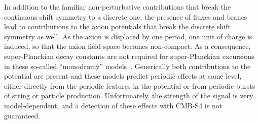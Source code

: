 

In addition to the familiar non-perturbative contributions that break the continuous shift symmetry to a discrete one, the presence of fluxes and branes lead to contributions to the axion potentials that break the discrete shift symmetry as well. As the axion is displaced by one period, one unit of charge is induced, so that the axion field space becomes non-compact. As a consequence, super-Planckian decay constants are not required for super-Planckian excursions in these so-called ``monodromy'' models~\cite{Silverstein:2008sg, McAllister:2008hb, Kaloper:2008fb, Berg:2009tg, Palti:2014kza,McAllister:2014mpa, Marchesano:2014mla, Blumenhagen:2015xpa,Hebecker:2015tzo}. Generically both contributions to the potential are present and these models predict periodic effects at some level, either directly from the periodic features in the potential or from periodic bursts of string or particle production. Unfortunately, the strength of the signal is very model-dependent, and a detection of these effects with CMB-S4 is not guaranteed.

